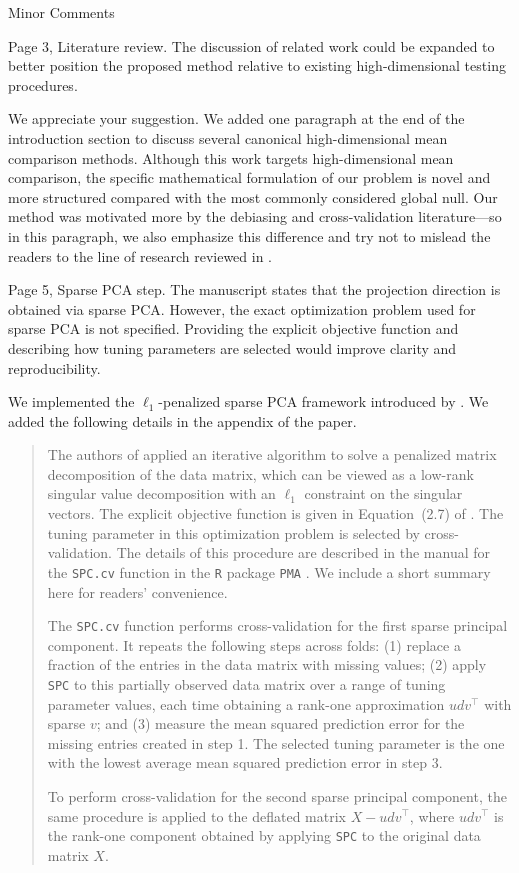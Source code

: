 \documentclass{article}
\theoremstyle{definition}
\begin{document}
\begin{shaded}
Minor Comments

Page 3, Literature review.
The discussion of related work could be expanded to better position the proposed method relative to existing high-dimensional testing procedures.
\end{shaded}

We appreciate your suggestion. We added one paragraph at the end of the introduction section to discuss several canonical high-dimensional mean comparison methods. Although this work targets high-dimensional mean comparison, the specific mathematical formulation of our problem is novel and more structured compared with the most commonly considered global null. Our method was motivated more by the debiasing and cross-validation literature---so in this paragraph, we also emphasize this difference and try not to mislead the readers to the line of research reviewed in \cite{huang2022overview}.

\begin{shaded}
Page 5, Sparse PCA step.
The manuscript states that the projection direction is obtained via sparse PCA. However, the exact optimization problem used for sparse PCA is not specified. Providing the explicit objective function and describing how tuning parameters are selected would improve clarity and reproducibility.
\end{shaded}

We implemented the $\ell_1$-penalized sparse PCA framework introduced by \cite{witten2009penalized}. We added the following details in the appendix of the paper. 

\begin{quote}
The authors of \cite{witten2009penalized} applied an iterative algorithm to solve a penalized matrix decomposition of the data matrix, which can be viewed as a low-rank singular value decomposition with an $\ell_1$ constraint on the singular vectors. The explicit objective function is given in Equation~(2.7) of \cite{witten2009penalized}. The tuning parameter in this optimization problem is selected by cross-validation. The details of this procedure are described in the manual for the \texttt{SPC.cv} function in the \texttt{R} package \texttt{PMA} \cite{PMA}. We include a short summary here for readers' convenience.

The \texttt{SPC.cv} function performs cross-validation for the first sparse principal component. It repeats the following steps across folds: (1) replace a fraction of the entries in the data matrix with missing values; (2) apply \texttt{SPC} to this partially observed data matrix over a range of tuning parameter values, each time obtaining a rank-one approximation $udv^\top$ with sparse $v$; and (3) measure the mean squared prediction error for the missing entries created in step 1. The selected tuning parameter is the one with the lowest average mean squared prediction error in step 3.

To perform cross-validation for the second sparse principal component, the same procedure is applied to the deflated matrix $X-udv^\top$, where $udv^\top$ is the rank-one component obtained by applying \texttt{SPC} to the original data matrix $X$.
\end{quote}
\end{document}
